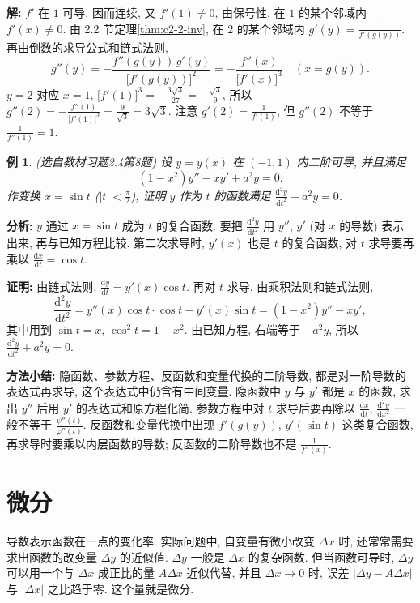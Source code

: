\documentclass[UTF8,openany]{ctexbook}
\theoremstyle{chinesetextbook}
\newtheorem{example}{例}[section]
\newenvironment{cnproof}{\par\indent\textbf{证明:} \ignorespaces}{\par}
\newenvironment{cnsolution}{\par\indent\textbf{解:} \ignorespaces}{\par}
\newcommand{\dd}{\mathrm d}
\begin{document}
\begin{cnsolution}
$f'$ 在 $1$ 可导, 因而连续, 又 $f'(1)\ne0$, 由保号性, 在 $1$ 的某个邻域内 $f'(x)\ne0$. 由 2.2 节定理\ref{thm:c2-2-inv}, 在 $2$ 的某个邻域内 $\displaystyle g'(y)=\frac1{f'(g(y))}$. 再由倒数的求导公式和链式法则,
\[
g''(y)=-\frac{f''(g(y))\,g'(y)}{\bigl[f'(g(y))\bigr]^2}=-\frac{f''(x)}{\bigl[f'(x)\bigr]^3}\quad(x=g(y)).
\]
$y=2$ 对应 $x=1$, $\displaystyle\bigl[f'(1)\bigr]^3=-\frac{3\sqrt3}{27}=-\frac{\sqrt3}9$, 所以 $\displaystyle g''(2)=-\frac{f''(1)}{\bigl[f'(1)\bigr]^3}=\frac9{\sqrt3}=3\sqrt3$. 注意 $\displaystyle g'(2)=\frac1{f'(1)}$, 但 $g''(2)$ 不等于 $\displaystyle\frac1{f''(1)}=1$.
\end{cnsolution}
\begin{example}\label{ex:c2-h4-8}
\textnormal{(选自教材习题2.4第8题)} 设 $y=y(x)$ 在 $(-1,1)$ 内二阶可导, 并且满足
\[
(1-x^2)y''-xy'+a^2y=0.
\]
作变换 $x=\sin t$ ($\displaystyle|t|<\frac\pi2$), 证明 $y$ 作为 $t$ 的函数满足 $\displaystyle\frac{\dd^2y}{\dd t^2}+a^2y=0$.
\end{example}
\par\indent\textbf{分析:} $y$ 通过 $x=\sin t$ 成为 $t$ 的复合函数. 要把 $\displaystyle\frac{\dd^2y}{\dd t^2}$ 用 $y''$, $y'$ (对 $x$ 的导数) 表示出来, 再与已知方程比较. 第二次求导时, $y'(x)$ 也是 $t$ 的复合函数, 对 $t$ 求导要再乘以 $\displaystyle\frac{\dd x}{\dd t}=\cos t$.
\begin{cnproof}
由链式法则, $\displaystyle\frac{\dd y}{\dd t}=y'(x)\cos t$. 再对 $t$ 求导, 由乘积法则和链式法则,
\[
\frac{\dd^2y}{\dd t^2}=y''(x)\cos t\cdot\cos t-y'(x)\sin t=(1-x^2)y''-xy',
\]
其中用到 $\sin t=x$, $\cos^2t=1-x^2$. 由已知方程, 右端等于 $-a^2y$, 所以 $\displaystyle\frac{\dd^2y}{\dd t^2}+a^2y=0$.
\end{cnproof}
\par\indent\textbf{方法小结:} 隐函数、参数方程、反函数和变量代换的二阶导数, 都是对一阶导数的表达式再求导, 这个表达式中仍含有中间变量. 隐函数中 $y$ 与 $y'$ 都是 $x$ 的函数, 求出 $y''$ 后用 $y'$ 的表达式和原方程化简. 参数方程中对 $t$ 求导后要再除以 $\displaystyle\frac{\dd x}{\dd t}$, $\displaystyle\frac{\dd^2y}{\dd x^2}$ 一般不等于 $\displaystyle\frac{\psi''(t)}{\varphi''(t)}$. 反函数和变量代换中出现 $f'(g(y))$, $y'(\sin t)$ 这类复合函数, 再求导时要乘以内层函数的导数; 反函数的二阶导数也不是 $\displaystyle\frac1{f''(x)}$.
\section{微分}
导数表示函数在一点的变化率. 实际问题中, 自变量有微小改变 $\Delta x$ 时, 还常常需要求出函数的改变量 $\Delta y$ 的近似值. $\Delta y$ 一般是 $\Delta x$ 的复杂函数. 但当函数可导时, $\Delta y$ 可以用一个与 $\Delta x$ 成正比的量 $A\Delta x$ 近似代替, 并且 $\Delta x\to0$ 时, 误差 $|\Delta y-A\Delta x|$ 与 $|\Delta x|$ 之比趋于零. 这个量就是微分.
\end{document}
